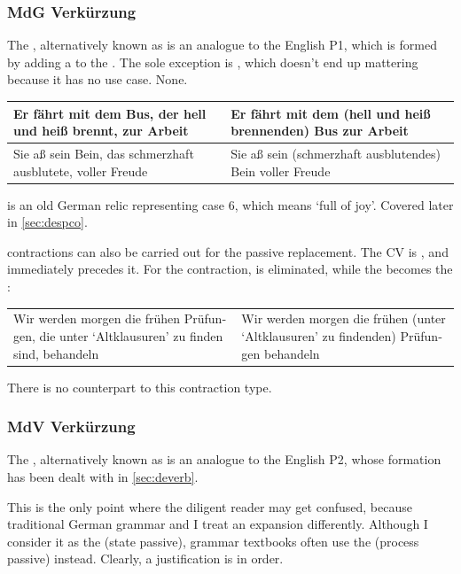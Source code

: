 \subsubsection{MdG Verkürzung}
The , alternatively known as  is an analogue to the English P1, which is formed by adding a  to the . The sole exception is , which doesn't end up mattering because it has no use case. None.
\begin{example}
    \begin{tabular}{m{7cm}|m{6cm}}
    Er fährt mit dem Bus, der hell und heiß brennt, zur Arbeit & Er fährt mit dem (hell und heiß brennenden) Bus zur Arbeit\\\hline
    Sie aß sein Bein, das schmerzhaft ausblutete, voller Freude & Sie aß sein (schmerzhaft ausblutendes) Bein voller Freude
    \end{tabular}
\end{example}
 is an old German relic representing case $6$, which means `full of joy'. Covered later in \autoref{sec:despco}. 

 contractions can also be carried out for the  passive replacement. The CV is , and  immediately precedes it. For the contraction,  is eliminated, while the  becomes the :
\begin{example}
    \begin{tabular}{m{7cm}|m{7cm}}
        \textgerman{Wir werden morgen die frühen Prüfungen, die unter \enquote*{Altklausuren} zu finden sind, behandeln} & \textgerman{Wir werden morgen die frühen (unter \enquote*{Altklausuren} zu findenden) Prüfungen behandeln}
    \end{tabular}
\end{example}
There is no  counterpart to this contraction type.
\subsubsection{MdV Verkürzung}
The , alternatively known as  is an analogue to the English P2, whose formation has been dealt with in \autoref{sec:deverb}.

This is the only point where the diligent reader may get confused, because traditional German grammar and I treat an  expansion differently. Although I consider it as the  (state passive), grammar textbooks often use the  (process passive) instead. Clearly, a justification is in order.

